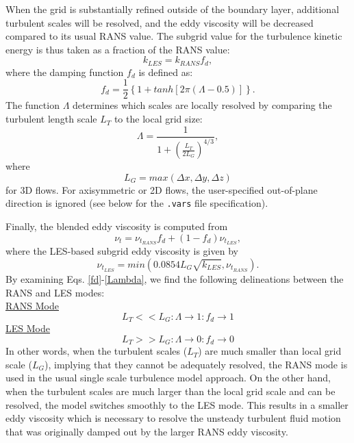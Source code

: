 When the grid is substantially refined outside of the boundary layer,
additional turbulent scales will be resolved, and the eddy viscosity
will be decreased compared to its usual RANS value.  The subgrid value
for the turbulence kinetic energy is thus taken as a fraction of the
RANS value:
\begin{equation}
k_{LES} = k_{RANS} f_d,
\end{equation}
where the damping function $f_d$ is defined as:
\begin{equation}
f_d = \frac{1}{2} \left\{1 + tanh [2 \pi (\Lambda - 0.5)] \right\}.
\label{fd}
\end{equation}
The function $\Lambda$ determines which scales are locally resolved by comparing the turbulent length scale $L_T$ to the local grid size:
\begin{equation}
\Lambda = \frac{1}{1 + \left(\frac{L_T}{2 L_G}\right)^{4/3}},
\label{Lambda}
\end{equation}
where
\begin{equation}
L_G = max(\Delta x, \Delta y, \Delta z)
\label{LG}
\end{equation}
for 3D flows.  For axisymmetric or 2D flows, the user-specified out-of-plane direction is ignored (see below for the \verb!.vars! file specification).

Finally, the blended eddy viscosity is computed from
\begin{equation}
\nu_t = \nu_{t_{RANS}} f_d + (1 - f_d) \nu_{t_{LES}},
\end{equation}
where the LES-based subgrid eddy viscosity is given by
\begin{equation}
\nu_{t_{LES}} = min(0.0854 L_G \sqrt{k_{LES}}, \nu_{t_{RANS}}).
\end{equation}
By examining Eqs. \ref{fd}-\ref{Lambda}, we find the following delineations between the RANS and LES modes:\\

\noindent
\underline{RANS Mode}
\begin{equation}
L_T << L_G : \Lambda \rightarrow 1 : f_d \rightarrow 1
\end{equation}
\underline{LES Mode}
\begin{equation}
L_T >> L_G : \Lambda \rightarrow 0 : f_d \rightarrow 0
\end{equation}
In other words, when the turbulent scales ($L_T$) are much smaller than local grid scale ($L_G$), implying that they cannot be adequately resolved, the RANS mode is used in the usual single scale turbulence model approach.  On the other hand, when the turbulent scales are much larger than the local grid scale and can be resolved, the model switches smoothly to the LES mode.  This results in a smaller eddy viscosity which is necessary to resolve the unsteady turbulent fluid motion that was originally damped out by the larger RANS eddy viscosity.

